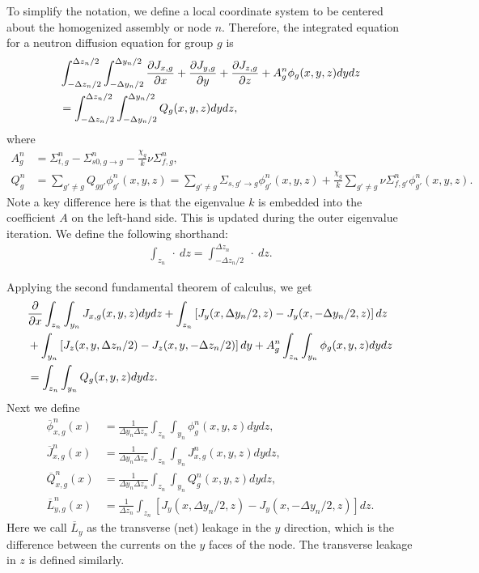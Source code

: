 To simplify the notation, we define a local coordinate system to be centered about the homogenized assembly or node $n$. Therefore, the integrated equation for a neutron diffusion equation for group $g$ is
\begin{align}
    &\int_{-\Delta z_n/2}^{\Delta z_n/2} \int_{-\Delta y_n/2}^{\Delta y_n/2} \frac{ \partial {J_{x,g}} }{ \partial {x} } + \frac{ \partial {J_{y,g}} }{ \partial {y} } + \frac{ \partial {J_{z,g}} }{ \partial {z} } + A_g^n \phi_g(x,y,z) dy dz \nonumber \\*
  &= \int_{-\Delta z_n/2}^{\Delta z_n/2} \int_{-\Delta y_n/2}^{\Delta y_n/2} Q_g(x,y,z) dy dz ,
\end{align}
where
\begin{subequations}
\begin{align}
  A_g^n &= \Sigma_{t,g}^n  - \Sigma_{s0,g \rightarrow g}^n - \frac{\chi_g}{k} \nu\Sigma_{f,g}^n, \\
  Q_g^n &= \sum_{g' \ne g} Q_{gg'} \phi_{g'}^n(x,y,z) =  \sum_{g' \ne g} \Sigma_{s,g' \rightarrow g} \phi_{g'}^n(x,y,z) + \frac{\chi_g}{k} \sum_{g' \ne g} \nu\Sigma_{f,g'}^n \phi_{g'}^n(x,y,z) .
\end{align}
\end{subequations}
Note a key difference here is that the eigenvalue $k$ is embedded into the coefficient $A$ on the left-hand side. This is updated during the outer eigenvalue iteration. We define the following shorthand:
\begin{align}
  \int_{z_n} \ \cdot \ dz = \int_{-\Delta z_n/2}^{\Delta z_n} \ \cdot \ dz .
\end{align}

Applying the second fundamental theorem of calculus, we get
\begin{align}
    &\frac{ \partial {} }{ \partial {x} } \int_{z_n} \int_{y_n}  J_{x,g}(x,y,z) dy dz 
    + \int_{z_n} \left[ J_y(x, \Delta y_n/2,z) - J_y(x,-\Delta y_n/2,z) \right] dz \nonumber \\*
   &+ \int_{y_n} \left[ J_z(x, y, \Delta z_n/2) - J_z(x,y,-\Delta z_n/2) \right] dy 
    + A_g^n \int_{z_n} \int_{y_n} \phi_g(x,y,z) dy dz \nonumber \\*
  &= \int_{z_n} \int_{y_n} Q_g(x,y,z) dy dz .
\end{align}
Next we define
\begin{subequations}
\begin{align}
  \overline{\phi}_{x,g}^n(x)  &=  \frac{1}{ \Delta y_n \Delta z_n } \int_{z_n} \int_{y_n} \phi_g^n(x,y,z) dy dz , \\
  \overline{J}_{x,g}^n(x)     &=  \frac{1}{ \Delta y_n \Delta z_n } \int_{z_n} \int_{y_n} J_{x,g}^n(x,y,z) dy dz , \\
  \overline{Q}_{x,g}^n(x)     &=  \frac{1}{ \Delta y_n \Delta z_n } \int_{z_n} \int_{y_n} Q_g^n(x,y,z) dy dz , \\
  \overline{L}_{y,g}^n(x)     &=  \frac{1}{ \Delta z_n } \int_{z_n} \left[ J_y(x, \Delta y_n/2,z) - J_y(x,-\Delta y_n/2,z) \right] dz .
\end{align}
\end{subequations}
Here we call $\overline{L}_y$ as the transverse (net) leakage in the $y$ direction, which is the difference between the currents on the $y$ faces of the node. The transverse leakage in $z$ is defined similarly.

